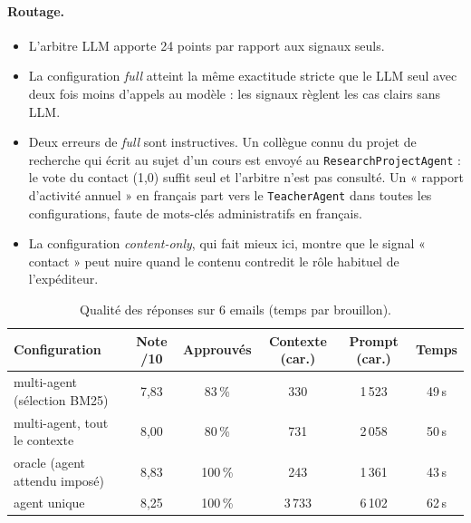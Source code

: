 \documentclass[11pt,a4paper]{article}
\newcommand{\code}[1]{\texttt{#1}}
\begin{document}
\paragraph{Routage.}
\begin{itemize}
  \item L'arbitre LLM apporte 24 points par rapport aux signaux seuls.
  \item La configuration \emph{full} atteint la même exactitude stricte que le LLM seul
        avec deux fois moins d'appels au modèle : les signaux règlent les cas clairs sans
        LLM.
  \item Deux erreurs de \emph{full} sont instructives. Un collègue connu du projet de
        recherche qui écrit au sujet d'un cours est envoyé au
        \code{ResearchProjectAgent} : le vote du contact (1,0) suffit seul et l'arbitre
        n'est pas consulté. Un « rapport d'activité annuel » en français part vers le
        \code{TeacherAgent} dans toutes les configurations, faute de mots-clés
        administratifs en français.
  \item La configuration \emph{content-only}, qui fait mieux ici, montre que le signal
        « contact » peut nuire quand le contenu contredit le rôle habituel de
        l'expéditeur.
\end{itemize}

\begin{table}[H]
\centering
\small
\begin{tabularx}{\linewidth}{L c c c c c}
\toprule
\textbf{Configuration} & \textbf{Note /10} & \textbf{Approuvés} & \textbf{Contexte (car.)} & \textbf{Prompt (car.)} & \textbf{Temps} \\
\midrule
multi-agent (sélection BM25) & 7,83 & 83\,\% & 330 & 1\,523 & 49\,s \\
multi-agent, tout le contexte & 8,00 & 80\,\% & 731 & 2\,058 & 50\,s \\
oracle (agent attendu imposé) & 8,83 & 100\,\% & 243 & 1\,361 & 43\,s \\
agent unique & 8,25 & 100\,\% & 3\,733 & 6\,102 & 62\,s \\
\bottomrule
\end{tabularx}
\caption{Qualité des réponses sur 6 emails (temps par brouillon).}
\label{tab:reponses}
\end{table}
\end{document}
